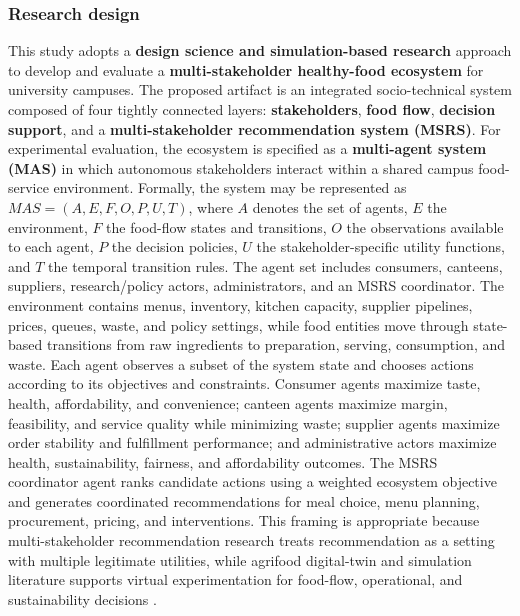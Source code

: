 \documentclass[journal]{IEEEtran}
\begin{document}
\subsubsection{Research design}\label{research-design}

This study adopts a \textbf{design science and simulation-based
research} approach to develop and evaluate a \textbf{multi-stakeholder
healthy-food ecosystem} for university campuses. The proposed artifact
is an integrated socio-technical system composed of four tightly
connected layers: \textbf{stakeholders}, \textbf{food flow},
\textbf{decision support}, and a \textbf{multi-stakeholder
recommendation system (MSRS)}. For experimental evaluation, the
ecosystem is specified as a \textbf{multi-agent system (MAS)} in which
autonomous stakeholders interact within a shared campus food-service
environment. Formally, the system may be represented as
\(MAS = (A, E, F, O, P, U, T)\), where \(A\) denotes the set of agents,
\(E\) the environment, \(F\) the food-flow states and transitions, \(O\)
the observations available to each agent, \(P\) the decision policies,
\(U\) the stakeholder-specific utility functions, and \(T\) the temporal
transition rules. The agent set includes consumers, canteens, suppliers,
research/policy actors, administrators, and an MSRS coordinator. The
environment contains menus, inventory, kitchen capacity, supplier
pipelines, prices, queues, waste, and policy settings, while food
entities move through state-based transitions from raw ingredients to
preparation, serving, consumption, and waste. Each agent observes a
subset of the system state and chooses actions according to its
objectives and constraints. Consumer agents maximize taste, health,
affordability, and convenience; canteen agents maximize margin,
feasibility, and service quality while minimizing waste; supplier agents
maximize order stability and fulfillment performance; and administrative
actors maximize health, sustainability, fairness, and affordability
outcomes. The MSRS coordinator agent ranks candidate actions using a
weighted ecosystem objective and generates coordinated recommendations
for meal choice, menu planning, procurement, pricing, and interventions.
This framing is appropriate because multi-stakeholder recommendation
research treats recommendation as a setting with multiple legitimate
utilities, while agrifood digital-twin and simulation literature
supports virtual experimentation for food-flow, operational, and
sustainability decisions
\cite{zheng2017msr, abdollahpouri2019fairness, wu2021multifr}.
\end{document}
